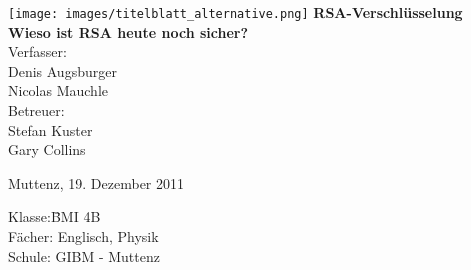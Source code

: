 \begin{titlepage}
\sffamily
\centering
\texttt{[image: images/titelblatt\_alternative.png]}
\vfill
{\bfseries\Huge RSA-Verschlüsselung}\\
\vfill
{\bfseries\Large Wieso ist RSA heute noch sicher?}\\
\vfill
Verfasser:\\[1ex]
Denis Augsburger\\
Nicolas Mauchle\\
\vfill
Betreuer:\\[1ex]
{\large Stefan Kuster}\\
{\large Gary Collins}\\
\vfill
\raggedright
\small
Muttenz, 19. Dezember 2011\\[2cm]
\begin{tabbing}
Klasse:\quad\quad\quad \=BMI 4B\\
Fächer: \> Englisch, Physik \\
Schule: \> GIBM - Muttenz
\end{tabbing}
\end{titlepage}

